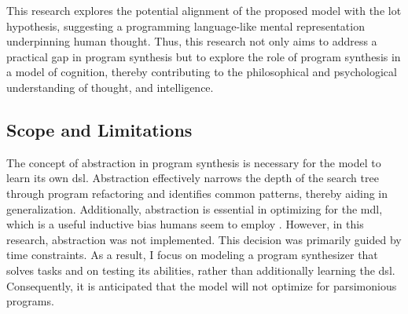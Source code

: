 This research explores the potential alignment of the proposed model with the \acrlong{lot} hypothesis, suggesting a programming language-like mental representation underpinning human thought. 
Thus, this research not only aims to address a practical gap in program synthesis but to explore the role of program synthesis in a model of cognition, thereby contributing to the philosophical and psychological understanding of thought, and intelligence. 

\subsection{Scope and Limitations}
The concept of abstraction in program synthesis is necessary for the model to learn its own \acrshort{dsl}. Abstraction effectively narrows the depth of the search tree through program refactoring and identifies common patterns, thereby aiding in generalization. Additionally, abstraction is essential in optimizing for the \acrlong{mdl}, which is a useful inductive bias humans seem to employ \cite{sable-meyerLanguageThoughtMental2022}.
However, in this research, abstraction was not implemented. This decision was primarily guided by time constraints. As a result, I focus on modeling a program synthesizer that solves tasks and on testing its abilities, rather than additionally learning the \acrshort{dsl}. Consequently, it is anticipated that the model will not optimize for parsimonious programs.




